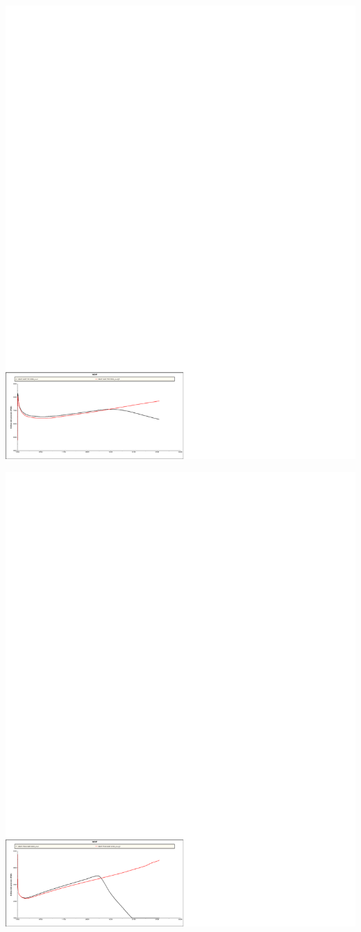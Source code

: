 \centerline{\includegraphics[clip=true, trim=0cm 0cm 10.6cm 22.6cm,width=1.3\textwidth]{graphics/wbhp_inj_comb.pdf}}
\centerline{\includegraphics[clip=true, trim=0cm 0cm 10.6cm 22.6cm,width=1.3\textwidth]{graphics/wbhp_prod_comb.pdf}}
